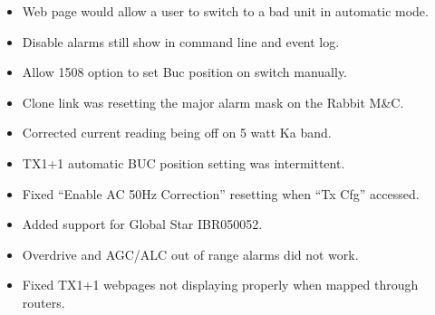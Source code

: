 \documentclass[letterpaper,10pt,english]{sphinxhowto}
\begin{document}
\begin{description}
\begin{itemize}
\end{itemize}

\begin{itemize}
\item {} 
\sphinxAtStartPar
Web page would allow a user to switch to a bad unit in automatic mode.

\item {} 
\sphinxAtStartPar
Disable alarms still show in command line and event log.

\item {} 
\sphinxAtStartPar
Allow \sphinxhyphen{}1508 option to set Buc position on switch manually.

\item {} 
\sphinxAtStartPar
Clone link was resetting the major alarm mask on the Rabbit M\&C.

\end{itemize}

\begin{itemize}
\item {} 
\sphinxAtStartPar
Corrected current reading being oﬀ on 5 watt Ka band.

\end{itemize}

\begin{itemize}
\item {} 
\sphinxAtStartPar
TX1+1 automatic BUC position setting was intermittent.

\end{itemize}

\begin{itemize}
\item {} 
\sphinxAtStartPar
Fixed “Enable AC 50Hz Correction” resetting when “Tx Cfg” accessed.

\end{itemize}

\begin{itemize}
\item {} 
\sphinxAtStartPar
Added support for Global Star IBR050052.

\item {} 
\sphinxAtStartPar
Overdrive and AGC/ALC out of range alarms did not work.

\end{itemize}

\begin{itemize}
\item {} 
\sphinxAtStartPar
Fixed TX1+1 webpages not displaying properly when mapped through routers.


\end{itemize}
\end{description}
\end{document}
